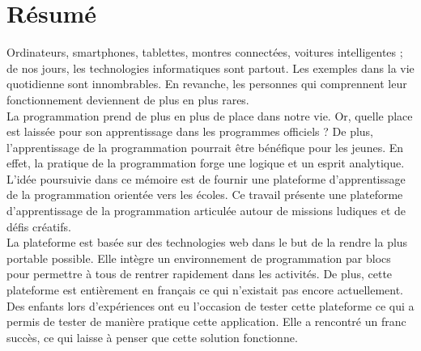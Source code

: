 ﻿\section*{Résumé}
Ordinateurs, smartphones, tablettes, montres connectées, voitures intelligentes ; de nos jours, les technologies informatiques sont partout. Les exemples dans la vie quotidienne sont innombrables. En revanche, les personnes qui comprennent leur fonctionnement deviennent de plus en plus rares.\\

La programmation prend de plus en plus de place dans notre vie. Or, quelle place est laissée pour son apprentissage dans les programmes officiels ? De plus, l'apprentissage de la programmation pourrait être bénéfique pour les jeunes. En effet, la pratique de la programmation forge une logique et un esprit analytique.\\

L'idée poursuivie dans ce mémoire est de fournir une plateforme d'apprentissage de la programmation orientée vers les écoles. Ce travail présente une plateforme d'apprentissage de la programmation articulée autour de missions ludiques et de défis créatifs.\\

La plateforme est basée sur des technologies web dans le but de la rendre la plus portable possible. Elle intègre un environnement de programmation par blocs pour permettre à tous de rentrer rapidement dans les activités. De plus, cette plateforme est entièrement en français ce qui n'existait pas encore actuellement.\\

Des enfants lors d'expériences ont eu l'occasion de tester cette plateforme ce qui a permis de tester de manière pratique cette application. Elle a rencontré un franc succès, ce qui laisse à penser que cette solution fonctionne.


